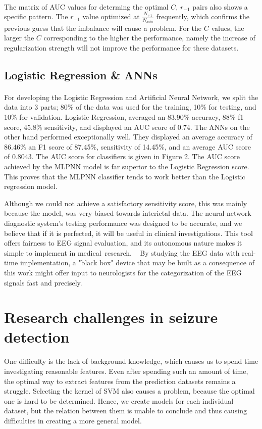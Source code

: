 \documentclass[10pt,twocolumn,letterpaper]{article}
\begin{document}
\paragraph{}The matrix of AUC values for determing the optimal $C$, $r_{-1}$ pairs also shows a specific pattern. The $r_{-1}$ value optimized at $\frac{N_{+1}}{N_{both}}$ frequently, which confirms the previous guess that the imbalance will cause a problem. For the $C$ values, the larger the $C$ corresponding to the higher the performance, namely the increase of regularization strength will not improve the performance for these datasets.

\subsection{Logistic Regression \& ANNs}
\paragraph{} For developing the Logistic Regression and Artificial Neural Network, we split the data into 3 parts; 80$\%$ of the data was used for the training, 10$\%$ for testing, and 10$\%$ for validation. Logistic Regression, averaged an 83.90$\%$ accuracy, 88$\%$ f1 score, 45.8$\%$ sensitivity, and displayed an AUC score of 0.74. The ANNs on the other hand performed exceptionally well. They displayed an average accuracy of 86.46$\%$ an F1 score of 87.45$\%$, sensitivity of 14.45$\%$, and an average AUC score of 0.8043. The AUC score for classifiers is given in Figure 2. The AUC score achieved by the MLPNN model is far superior to the Logistic Regression score. This proves that the MLPNN classifier tends to work better than the Logistic regression model. 

Although we could not achieve a satisfactory sensitivity score, this was mainly because the model, was very biased towards interictal data. The neural network diagnostic system's testing performance was designed to be accurate, and we believe that if it is perfected, it will be useful in clinical investigations. This tool offers fairness to EEG signal evaluation, and its autonomous nature makes it simple to implement in medical research.   By studying the EEG data with real-time implementation, a "black box" device that may be built as a consequence of this work might offer input to neurologists for the categorization of the EEG signals fast and precisely.



\section{Research challenges in seizure detection}
One difficulty is the lack of background knowledge, which causes us to spend time investigating reasonable features. Even after spending such an amount of time, the optimal way to extract features from the prediction datasets remains a struggle. Selecting the kernel of SVM also causes a problem, because the optimal one is hard to be determined. Hence, we create models for each individual dataset, but the relation between them is unable to conclude and thus causing difficulties in creating a more general model.
\end{document}
